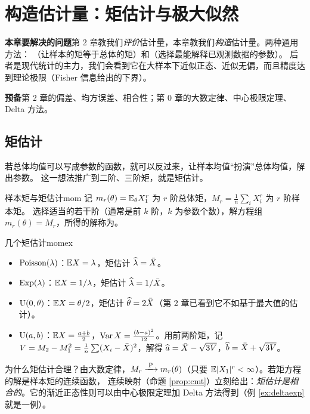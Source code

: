 \chapter{构造估计量：矩估计与极大似然}
\label{ch:mle}

\begin{chapguide}
\textbf{\heiti 本章要解决的问题}\quad 第 2 章教我们\emph{评价}估计量，本章教我们\emph{构造}估计量。两种通用方法：
（让样本的矩等于总体的矩）和（选择最能解释已观测数据的参数）。
后者是现代统计的主力，我们会看到它在大样本下近似正态、近似无偏，而且精度达到理论极限（Fisher 信息给出的下界）。\par\smallskip
\textbf{\heiti 预备}\quad 第 2 章的偏差、均方误差、相合性；第 0 章的大数定律、中心极限定理、Delta 方法。
\end{chapguide}

\section{矩估计}

若总体均值可以写成参数的函数，就可以反过来，让样本均值“扮演”总体均值，解出参数。
这一想法推广到二阶、三阶矩，就是矩估计。

\begin{definition}{样本矩与矩估计}{mom}
记 $m_r(\theta)=\mathbb{E}_\theta X_1^r$ 为 $r$ 阶总体矩，$M_r=\frac1n\sum_iX_i^r$ 为 $r$ 阶样本矩。
选择适当的若干阶（通常是前 $k$ 阶，$k$ 为参数个数），解方程组 $m_r(\theta)=M_r$，所得的解称为。
\end{definition}

\begin{example}{几个矩估计}{momex}
\begin{itemize}
\item $\operatorname{Poisson}(\lambda)$：$\mathbb{E} X=\lambda$，矩估计 $\widehat{\lambda}=\bar{X}$。
\item $\operatorname{Exp}(\lambda)$：$\mathbb{E} X=1/\lambda$，矩估计 $\widehat{\lambda}=1/\bar{X}$。
\item $\operatorname{U}(0,\theta)$：$\mathbb{E} X=\theta/2$，矩估计 $\widehat{\theta}=2\bar{X}$（第 2 章已看到它不如基于最大值的估计）。
\item $\operatorname{U}(a,b)$：$\mathbb{E} X=\frac{a+b}2$，$\operatorname{Var} X=\frac{(b-a)^2}{12}$。用前两阶矩，记 $V=M_2-M_1^2=\frac1n\sum(X_i-\bar{X})^2$，解得
$\widehat{a}=\bar{X}-\sqrt{3V}$，$\widehat{b}=\bar{X}+\sqrt{3V}$。
\end{itemize}
\end{example}

为什么矩估计合理？由大数定律，$M_r\xrightarrow{\;\mathrm{P}\;} m_r(\theta)$（只要 $\mathbb{E}|X_1|^r<\infty$）。若矩方程的解是样本矩的连续函数，
连续映射（命题 \ref{prop:cmt}）立刻给出：\emph{矩估计是相合的}。它的渐近正态性则可以由中心极限定理加 Delta 方法得到（例 \ref{ex:deltaexp} 就是一例）。

